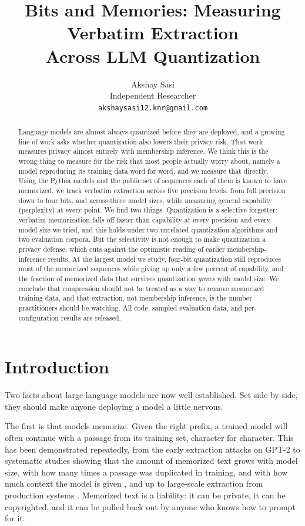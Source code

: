\documentclass{article}
\title{Bits and Memories: Measuring Verbatim Extraction\\
Across LLM Quantization}
\author{%
  Akshay Sasi \\
  Independent Researcher \\
  \texttt{akshaysasi12.knr@gmail.com} \\
}
\begin{document}
\maketitle

\begin{abstract}
Language models are almost always quantized before they are deployed, and a
growing line of work asks whether quantization also lowers their privacy
risk. That work measures privacy almost entirely with membership inference.
We think this is the wrong thing to measure for the risk that most people
actually worry about, namely a model reproducing its training data word for
word, and we measure that directly. Using the Pythia models and the public
set of sequences each of them is known to have memorized, we track verbatim
extraction across five precision levels, from full precision down to four
bits, and across three model sizes, while measuring general capability
(perplexity) at every point. We find two things. Quantization is a selective
forgetter: verbatim memorization falls off faster than capability at every
precision and every model size we tried, and this holds under two unrelated
quantization algorithms and two evaluation corpora. But the selectivity is
not enough to make quantization a privacy defense, which cuts against the
optimistic reading of earlier membership-inference results. At the largest
model we study, four-bit quantization still reproduces most of the memorized
sequences while giving up only a few percent of capability, and the fraction
of memorized data that survives quantization \emph{grows} with model size. We conclude that
compression should not be treated as a way to remove memorized training
data, and that extraction, not membership inference, is the number
practitioners should be watching. All code, sampled evaluation data, and
per-configuration results are released.
\end{abstract}

\section{Introduction}

Two facts about large language models are now well established. Set side by
side, they should make anyone deploying a model a little nervous.

The first is that models memorize. Given the right prefix, a trained model
will often continue with a passage from its training set, character for
character. This has been demonstrated repeatedly, from the early extraction
attacks on GPT-2 \citep{carlini2021extracting} to systematic studies showing
that the amount of memorized text grows with model size, with how many times
a passage was duplicated in training, and with how much context the model is
given \citep{carlini2022quantifying}, and up to large-scale extraction from
production systems \citep{nasr2023scalable}. Memorized text is a liability:
it can be private, it can be copyrighted, and it can be pulled back out by
anyone who knows how to prompt for it.
\end{document}
